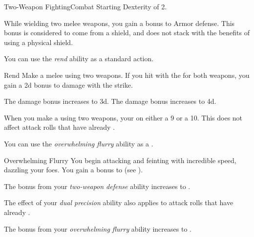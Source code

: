     \begin{feat}{Two-Weapon Fighting}{Combat}
        \featpre Starting Dexterity of 2.

         While wielding two melee weapons, you gain a  bonus to Armor defense.
        This bonus is considered to come from a shield, and does not stack with the benefits of using a physical shield.

         You can use the \textit{rend} ability as a standard action.
        \begin{freeability}{Rend}
            Make a melee  using two weapons.
            If you hit with the  for both weapons, you gain a \plus2d bonus to damage with the strike.

            \rankline
             The damage bonus increases to \plus3d.
             The damage bonus increases to \plus4d.
        \end{freeability}

         When you make a  using two weapons, your   on either a 9 or a 10.
        This does not affect attack rolls that have already .

         You can use the \textit{overwhelming flurry} ability as a .
        \begin{attuneability}{Overwhelming Flurry}
            You begin attacking and feinting with incredible speed, dazzling your foes.
            You gain a  bonus to  (see ).
        \end{attuneability}

         The bonus from your \textit{two-weapon defense} ability increases to .

         The effect of your \textit{dual precision} ability also applies to attack rolls that have already .

         The bonus from your \textit{overwhelming flurry} ability increases to .
    \end{feat}


